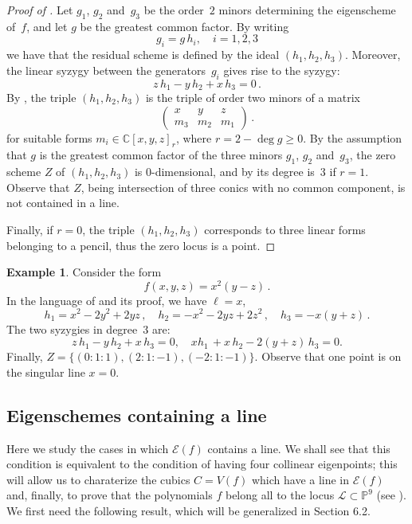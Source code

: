 \documentclass[a4paper, 11pt, reqno]{amsart}
\theoremstyle{plain}
\theoremstyle{definition}
\newtheorem{es}[lemma]{Example}
\newcommand{\C}{\mathbb{C}}
\newcommand{\p}{\mathbb{P}}
\newcommand{\sL}{\mathcal{L}}
\newcommand{\Eig}[1]{\mathcal{E}\!\left( {#1} \right)}
\begin{document}
\begin{proof}[Proof of ]
Let $g_1$, $g_2$ and~$g_3$ be the order~$2$ minors determining the eigenscheme of~$f$, and let $g$ be the greatest common factor.
By writing
%
\[
  g_i = g \, h_i, \quad i=1,2,3
\]
%
we have that the residual scheme is defined by the ideal
$(h_1,h_2,h_3)$. Moreover, the linear
syzygy between the generators~$g_i$ gives rise to the syzygy:
%
\[
  z\, h_1 - y\, h_2 + x\, h_3 = 0 \,.
\]
%
By , the triple $(h_1,h_2,h_3)$ is the triple of order two minors of a matrix
%
\[
  \begin{pmatrix}
    x & y & z \\
    m_3 & m_2 & m_1
  \end{pmatrix} \,.
\]
%
for suitable forms $m_i \in \C[x,y,z]_r$, where $r =2 - \deg g \ge 0$.
By the assumption that $g$ is the greatest common factor of the three minors $g_1$, $g_2$ and~$g_3$, the zero scheme $Z$ of $(h_1,h_2,h_3)$ is $0$-dimensional, and
by  its degree is~$3$ if $r=1$. Observe that $Z$, being intersection of three conics with no common component, is not contained in a line.

Finally, if $r=0$, the triple $(h_1,h_2,h_3)$ corresponds to three linear forms belonging to a pencil, thus the zero locus is a point.
\end{proof}


\begin{es}
Consider the form
%
\[
  f(x, y, z) = x^2 (y - z) \,.
\]
%
In the language of  and its proof, we have $\ell=x$,
%
\[
 h_1 = x^2-2y^2+2yz \,, \quad
 h_2 = -x^2-2yz+2z^2\,, \quad
 h_3 =-x(y+z) \,.
\]
%
The two syzygies in degree~$3$ are:
%
\[
  z \, h_1 - y \, h_2 + x \, h_3 = 0, \quad
  xh_1 \, +x\,h_2 - 2(y+z) \, h_3 = 0.
\]
%
Finally, $Z = \{ (0:1:1),(2:1:-1),(-2:1:-1) \}$.
Observe that one point is on the singular line $x=0$.
\end{es}


\subsection{Eigenschemes containing a line}
Here we study the cases in which $\Eig{f}$ contains a line. We shall see that
this condition is equivalent to the condition of having four collinear
eigenpoints; this will allow us to charaterize the cubics $C = V(f)$ which have a line
in $\Eig{f}$ and, finally, to prove that the polynomials $f$
belong all to the locus $\sL \subset \p^9$ (see ).
We first need the following result, which will be generalized in Section 6.2.
\end{document}
